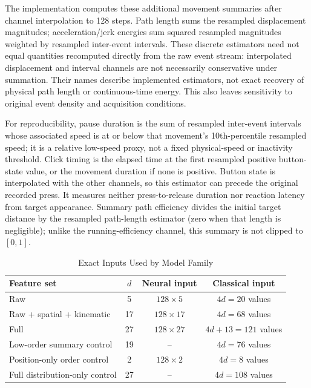 \documentclass[conference]{IEEEtran}
\begin{document}
The implementation computes these additional movement summaries after channel
interpolation to 128 steps. Path length sums the resampled displacement
magnitudes; acceleration/jerk energies sum squared resampled magnitudes
weighted by resampled inter-event intervals. These discrete estimators need
not equal quantities recomputed directly from the raw event stream:
interpolated displacement and interval channels are not necessarily
conservative under summation. Their names describe implemented estimators,
not exact recovery of physical path length or continuous-time energy. This
also leaves sensitivity to original event density and acquisition conditions.

For reproducibility, pause duration is the sum of resampled inter-event
intervals whose associated speed is at or below that movement's 10th-percentile
resampled speed; it is a relative low-speed proxy, not a fixed physical-speed
or inactivity threshold. Click timing is the elapsed time at the first
resampled positive button-state value, or the movement duration if none is
positive. Button state is interpolated with the other channels, so this
estimator can precede the original recorded press. It measures neither
press-to-release duration nor reaction latency from target appearance.
Summary path efficiency divides the initial target distance by the resampled
path-length estimator (zero when that length is negligible); unlike the
running-efficiency channel, this summary is not clipped to $[0,1]$.

\begin{table}[t]
\centering
\caption{Exact Inputs Used by Model Family}
\label{tab:model_inputs}
\begin{tabular}{lccc}
\toprule
\textbf{Feature set} & $d$ & \textbf{Neural input} & \textbf{Classical input} \\
\midrule
Raw & 5 & $128\times5$ & $4d=20$ values \\
Raw + spatial + kinematic & 17 & $128\times17$ & $4d=68$ values \\
Full & 27 & $128\times27$ & $4d+13=121$ values \\
Low-order summary control & 19 & -- & $4d=76$ values \\
Position-only order control & 2 & $128\times2$ & $4d=8$ values \\
Full distribution-only control & 27 & -- & $4d=108$ values \\
\bottomrule
\end{tabular}
\end{table}
\end{document}
